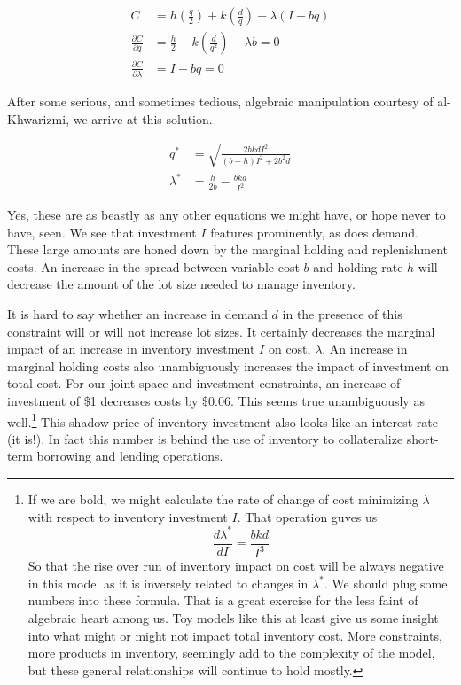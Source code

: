 \documentclass[
]{book}
\begin{document}
\[
\begin{align}
C &= h\left(\frac{q}{2}\right) + k\left(\frac{d}{q}\right) +\lambda(I - bq) \\
\frac{\partial C}{\partial q} &= \frac{h}{2} - k\left(\frac{d}{q^{2}}\right) - \lambda b = 0\\
\frac{\partial C}{\partial \lambda} &= I - bq = 0
\end{align}
\]

After some serious, and sometimes tedious, algebraic manipulation courtesy of al-Khwarizmi, we arrive at this solution.

\[
\begin{align}
q^*      &= \sqrt{\frac{2bkdI^2}{(b-h)I^2+2b^2d}} \\
\lambda^* &= \frac{h}{2b}-\frac{bkd}{I^2}
\end{align}
\]

Yes, these are as beastly as any other equations we might have, or hope never to have, seen. We see that investment \(I\) features prominently, as does demand. These large amounts are honed down by the marginal holding and replenishment costs. An increase in the spread between variable cost \(b\) and holding rate \(h\) will decrease the amount of the lot size needed to manage inventory.

It is hard to say whether an increase in demand \(d\) in the presence of this constraint will or will not increase lot sizes. It certainly decreases the marginal impact of an increase in inventory investment \(I\) on cost, \(\lambda\). An increase in marginal holding costs also unambiguously increases the impact of investment on total cost. For our joint space and investment constraints, an increase of investment of \$1 decreases costs by \$0.06. This seems true unambiguously as well.\footnote{If we are bold, we might calculate the rate of change of cost minimizing \(\lambda\) with respect to inventory investment \(I\). That operation guves us
  \[
  \frac{d \lambda^*}{dI} = \frac{bkd}{I^3}
  \]
  So that the rise over run of inventory impact on cost will be always negative in this model as it is inversely related to changes in \(\lambda^*\).
  We should plug some numbers into these formula. That is a great exercise for the less faint of algebraic heart among us. Toy models like this at least give us some insight into what might or might not impact total inventory cost. More constraints, more products in inventory, seemingly add to the complexity of the model, but these general relationships will continue to hold mostly.} This shadow price of inventory investment also looks like an interest rate (it is!). In fact this number is behind the use of inventory to collateralize short-term borrowing and lending operations.
\end{document}
